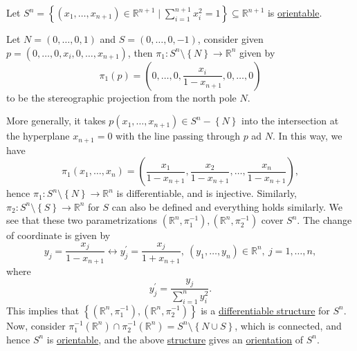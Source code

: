 \begin{eg}
	Let \(S^n = \left\{ (x_1, \ldots , x_{n+1})\in \mathbb{R} ^{n+1} \mid \sum_{i=1}^{n+1} x_i^2 = 1 \right\} \subseteq \mathbb{R} ^{n+1}\) is \hyperref[def:orientable]{orientable}.
\end{eg}
\begin{explanation}
	Let \(N=(0, \ldots , 0, 1)\) and \(S=(0, \ldots , 0, -1)\), consider given \(p=(0, \ldots , 0, x_i, 0, \ldots , x_{n+1} )\), then \(\pi _1\colon S^n \setminus \left\{ N \right\} \to \mathbb{R} ^n\) given by
	\[
		\pi _1(p) = \left( 0, \ldots , 0, \frac{x_i}{1-x_{n+1}}, 0, \ldots , 0 \right)
	\]
	to be the stereographic projection from the north pole \(N\).

	\begin{center}
	\end{center}

	More generally, it takes \(p(x_1, \ldots , x_{n+1})\in S^{n}-\left\{ N \right\}\) into the intersection at the hyperplane \(x_{n+1}= 0\) with the line passing through \(p\) ad \(N\). In this way, we have
	\[
		\pi _1(x_1, \ldots , x_n) = \left( \frac{x_1}{1-x_{n+1}}, \frac{x_2}{1-x_{n+1}}, \ldots , \frac{x_n}{1-x_{n+1}} \right),
	\]
	hence \(\pi _1\colon S^n \setminus \left\{ N \right\} \to \mathbb{R} ^n\) is differentiable, and is injective. Similarly, \(\pi _2\colon S^n \setminus \left\{ S \right\} \to \mathbb{R} ^n\) for \(S\) can also be defined and everything holds similarly. We see that these two parametrizations \((\mathbb{R} ^n, \pi _1 ^{-1} ), (\mathbb{R} ^n, \pi _2 ^{-1} )\) cover \(S^n\). The change of coordinate is given by
	\[
		y_j = \frac{x_j}{1 - x_{n+1}} \leftrightarrow y_j^\prime = \frac{x_j}{1 + x_{n+1}},\ (y_1, \ldots , y_n) \in \mathbb{R} ^n,\ j = 1, \ldots , n,
	\]
	where
	\[
		y_j ^\prime = \frac{y_j }{\sum_{i=1}^n y_i ^2 }.
	\]
	This implies that \(\left\{ (\mathbb{R} ^n, \pi _1 ^{-1} ), (\mathbb{R} ^n, \pi _2 ^{-1} ) \right\} \) is a \hyperref[def:smooth-structure]{differentiable structure} for \(S^n\). Now, consider \(\pi _1 ^{-1} (\mathbb{R} ^n) \cap \pi _2 ^{-1} (\mathbb{R} ^n) = S^n \setminus \left\{ N \cup S \right\} \), which is connected, and hence \(S^n\) is \hyperref[def:orientable]{orientable}, and the above \hyperref[def:smooth-structure]{structure} gives an \hyperref[def:orientation]{orientation} of \(S^n\).
\end{explanation}